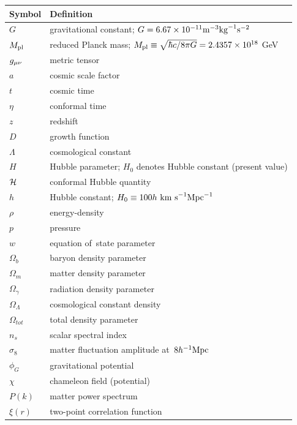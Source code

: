 \begin{tabular}{ll}
\hline\hline
Symbol & Definition \\
\hline
$G$ & gravitational constant; $G=6.67\times10^{-11}\rm{m}^{-3}\rm{kg}^{-1}\rm{s}^{-2}$ \\
$M_{\text{\scriptsize pl}}$ & reduced Planck mass; $M_{\text{\scriptsize pl}}\equiv\sqrt{\hbar c/8\pi G} = 2.4357\times10^{18}$ GeV\\
$g_{\mu\nu}$ & metric tensor \\
$a$ & cosmic scale factor \\
$t$ & cosmic time \\
$\eta$ & conformal time \\
$z$ & redshift \\
$D$ & growth function \\
$\Lambda$ & cosmological constant \\
$H$ & Hubble parameter; $H_0$ denotes Hubble constant (present value) \\
$\mathcal{H}$ & conformal Hubble quantity \\
$h$ & Hubble constant; $H_0\equiv100 h \rm{\ km\ s}^{-1}\rm{Mpc}^{-1}$ \\
$\rho$ & energy-density \\
$p$ & pressure \\
$w$ & equation of~state parameter \\
$\Omega_b$ & baryon density parameter \\
$\Omega_m$ & matter density parameter \\
$\Omega_\gamma$ & radiation density parameter \\
$\Omega_\Lambda$ & cosmological constant density \\
$\Omega_{tot}$ & total density parameter \\
$n_s$ & scalar spectral index \\
$\sigma_8$ & matter fluctuation amplitude at~$8h^{-1}\text{Mpc}$ \\
$\phi_G$ & gravitational potential \\
$\chi$ & chameleon field (potential) \\
$P(k)$ & matter power spectrum \\
$\xi(r)$ & two-point correlation function \\
\hline


\hline\hline
\end{tabular}\clearpage{}


